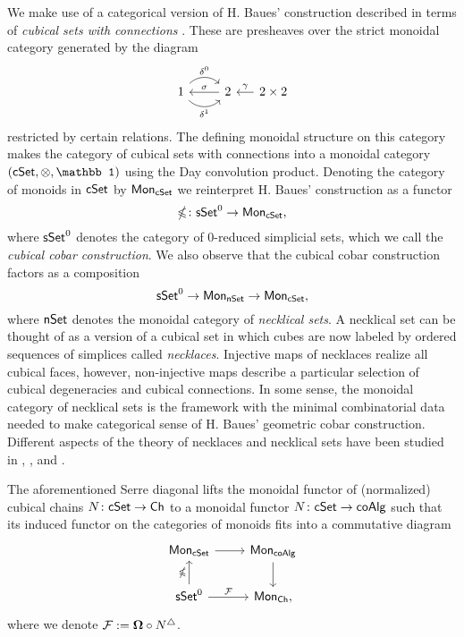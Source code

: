 We make use of a categorical version of H. Baues' construction described in terms of \textit{cubical sets with connections} \cite{Brown-Higgins}. These are presheaves over the strict monoidal category generated by the diagram
\begin{equation*}
\begin{tikzcd}
1 \arrow[r, out=45, in=135, "\delta^0"] \arrow[r, out=-45, in=-135, "\delta^1"'] & 2 \arrow[l, "\sigma"'] &[-10pt] \arrow[l, "\gamma"'] 2 \times 2
\end{tikzcd}
\end{equation*}
restricted by certain relations.
The defining monoidal structure on this category makes the category of cubical sets with connections into a monoidal category $(\cSet, \otimes, \mathbb 1)$ using the Day convolution product.
Denoting the category of monoids in $\mathsf{cSet}$ by $\mathsf{Mon}_{\mathsf{cSet}}$ we reinterpret H. Baues' construction as a functor
$$\mathbb{\Omega} \colon \mathsf{sSet}^0 \to \mathsf{Mon}_{\mathsf{cSet}},$$
where $\mathsf{sSet}^0$ denotes the category of $0$-reduced simplicial sets, which we call the \textit{cubical cobar construction}. We also observe that the cubical cobar construction factors as a composition
$$\mathsf{sSet}^0 \to \mathsf{Mon}_{\mathsf{nSet}} \to \mathsf{Mon}_{\mathsf{cSet}},
$$
where $\mathsf{nSet}$ denotes the monoidal category of \textit{necklical sets}. A necklical set can be thought of as a version of a cubical set in which cubes are now labeled by ordered sequences of simplices called \textit{necklaces}. Injective maps of necklaces realize all cubical faces, however, non-injective maps describe a particular selection of cubical degeneracies and cubical connections. In some sense, the monoidal category of necklical sets is the framework with the minimal combinatorial data needed to make categorical sense of H. Baues' geometric cobar construction. Different aspects of the theory of necklaces and necklical sets have been studied in \cite{Dugger-Spivak}, \cite{Galvez-Kaufmann-Tonks}, and \cite{rivera-zeinalian-cubical}.

The aforementioned Serre diagonal lifts the monoidal functor of (normalized) cubical chains $N \colon \mathsf{cSet} \to \mathsf{Ch}$ to a monoidal functor $N \colon \mathsf{cSet} \to \mathsf{coAlg}$ such that its induced functor on the categories of monoids fits into a commutative diagram
\begin{equation*}
\begin{tikzcd}
\Mon_{\cSet} \arrow[r] & \Mon_{\coAlg} \arrow[d] \\
\sSet^0 \arrow[r, "\mathcal{F}"] \arrow[u, "\gcobar"] & \Mon_{\Ch},
\end{tikzcd}
\end{equation*}
where we denote $\mathcal{F}:=\mathbf{\Omega} \circ N^{\triangle}$.

